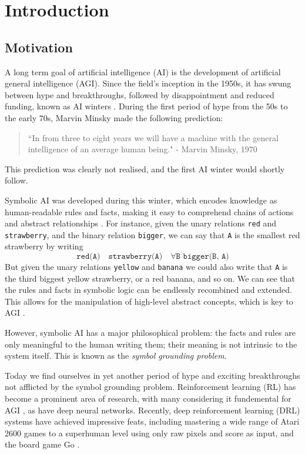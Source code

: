 \chapter{Introduction}

\section{Motivation}

A long term goal of artificial intelligence (AI) is the development of artificial general intelligence (AGI). Since the field's inception in the 1950s, it has swung between hype and breakthroughs, followed by disappointment and reduced funding, known as AI winters \cite{Knight2016}. During the first period of hype from the 50s to the early 70s, Marvin Minsky made the following prediction: \cite{Darrach}

\begin{quote} 
\centering 
``In from three to eight years we will have a machine with the general intelligence of an average human being." - Marvin Minsky, 1970
\end{quote}

This prediction was clearly not realised, and the first AI winter would shortly follow.

Symbolic AI was developed during this winter, which encodes knowledge as human-readable rules and facts, making it easy to comprehend chains of actions and abstract relationships \cite{Reingold2001}. For instance, given the unary relations \texttt{red} and \texttt{strawberry}, and the binary relation \texttt{bigger}, we can say that \texttt{A} is the smallest red strawberry by writing $$\texttt{red(A)} \quad \texttt{strawberry(A)} \quad \forall\texttt{B bigger(B, A)}$$ But given the unary relations \texttt{yellow} and \texttt{banana} we could also write that \texttt{A} is the third biggest yellow strawberry, or a red banana, and so on. We can see that the rules and facts in symbolic logic can be endlessly recombined and extended. This allows for the manipulation of high-level abstract concepts, which is key to AGI \cite{Garnelo2016}.

However, symbolic AI has a major philosophical problem: the facts and rules are only meaningful to the human writing them; their meaning is not intrinsic to the system itself. This is known as the \textit{symbol grounding problem}.

Today we find ourselves in yet another period of hype and exciting breakthroughs not afflicted by the symbol grounding problem. Reinforcement learning (RL) has become a prominent area of research, with many considering it fundemental for AGI \cite{Hutter2005}, as have deep neural networks. Recently, deep reinforcement learning (DRL) systems have achieved impressive feats, including mastering a wide range of Atari 2600 games to a superhuman level using only raw pixels and score as input, and the board game Go \cite{Mnih2015, Silver2016}.\\


